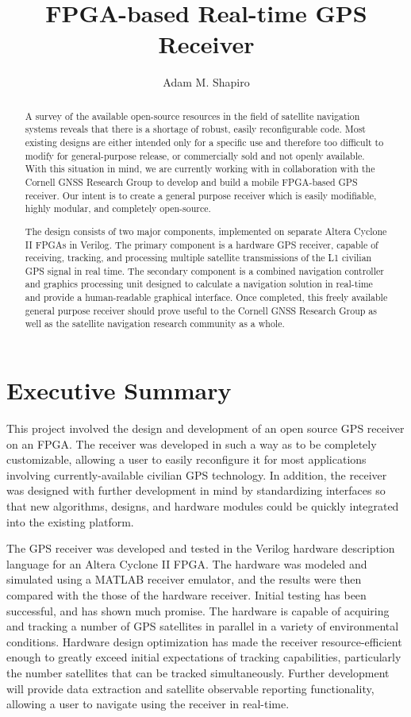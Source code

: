 \documentclass[12pt]{article}
\title{FPGA-based Real-time GPS Receiver}
\author{Adam M. Shapiro}
\begin{document}
\maketitle

\begin{abstract}
A survey of the available open-source resources in the field of satellite navigation 
systems reveals that there is a shortage of robust, easily reconfigurable code. Most existing 
designs are either intended only for a specific use and therefore too difficult to modify for general-purpose release, or commercially sold and not openly available. With this situation in mind, we are currently working with in collaboration with the Cornell GNSS Research Group to develop and build a mobile FPGA-based GPS receiver. Our intent is to create a general purpose receiver which is easily modifiable, highly modular, and completely open-source.

The design consists of two major components, implemented on separate Altera Cyclone II FPGAs in Verilog. The primary component is a hardware GPS receiver, capable of receiving, tracking, and processing multiple satellite transmissions of the L1 civilian GPS signal in real time. The secondary component is a combined navigation controller and graphics processing unit designed to calculate a navigation solution in real-time and provide a human-readable graphical interface. Once completed, this freely available general purpose receiver should prove useful to the Cornell GNSS Research Group as well as the satellite navigation research community as a whole.
\end{abstract}

\section*{Executive Summary}
This project involved the design and development of an open source GPS receiver on an FPGA. The receiver was developed in such a way as to be completely customizable, allowing a user to easily reconfigure it for most applications involving currently-available civilian GPS technology. In addition, the receiver was designed with further development in mind by standardizing interfaces so that new algorithms, designs, and hardware modules could be quickly integrated into the existing platform.

The GPS receiver was developed and tested in the Verilog hardware description language for an Altera Cyclone II FPGA. The hardware was modeled and simulated using a MATLAB receiver emulator, and the results were then compared with the those of the hardware receiver. Initial testing has been successful, and has shown much promise. The hardware is capable of acquiring and tracking a number of GPS satellites in parallel in a variety of environmental conditions. Hardware design optimization has made the receiver resource-efficient enough to greatly exceed initial expectations of tracking capabilities, particularly the number satellites that can be tracked simultaneously. Further development will provide data extraction and satellite observable reporting functionality, allowing a user to navigate using the receiver in real-time.
\end{document}
